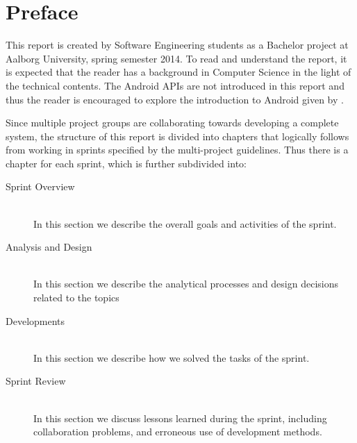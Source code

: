 \newcommand{\headerPreface}{Preface}
\cleardoublepage
{}
\pdfbookmark{\headerPreface}{chap:preface}
\chapter*{\headerPreface}\label{chap:preface}






This report is created by Software Engineering students as a Bachelor project at Aalborg University, spring semester 2014.
To read and understand the report, it is expected that the reader has a background in Computer Science in the light of the technical contents.
The Android APIs are not introduced in this report and thus the reader is encouraged to explore the introduction to Android given by \citet{androidIntroduction}.

Since multiple project groups are collaborating towards developing a complete system, the structure of this report is divided into chapters that logically follows from working in sprints specified by the multi-project guidelines.
Thus there is a chapter for each sprint, which is further subdivided into:

\begin{description}
\item[Sprint Overview] \hfill \\
In this section we describe the overall goals and activities of the sprint.
\item[Analysis and Design] \hfill \\
In this section we describe the analytical processes and design decisions related to the topics 
\item[Developments] \hfill \\
In this section we describe how we solved the tasks of the sprint.
\item[Sprint Review] \hfill \\
In this section we discuss lessons learned during the sprint, including collaboration problems, and erroneous use of development methods.
\end{description}

